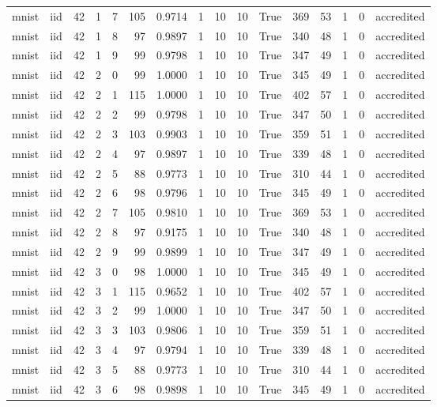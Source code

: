 \begin{tabular}{llrrrrrrrrrrrrrl}
mnist & iid & 42 & 1 & 7 & 105 & 0.9714 & 1 & 10 & 10 & True & 369 & 53 & 1 & 0 & accredited \\
mnist & iid & 42 & 1 & 8 & 97 & 0.9897 & 1 & 10 & 10 & True & 340 & 48 & 1 & 0 & accredited \\
mnist & iid & 42 & 1 & 9 & 99 & 0.9798 & 1 & 10 & 10 & True & 347 & 49 & 1 & 0 & accredited \\
mnist & iid & 42 & 2 & 0 & 99 & 1.0000 & 1 & 10 & 10 & True & 345 & 49 & 1 & 0 & accredited \\
mnist & iid & 42 & 2 & 1 & 115 & 1.0000 & 1 & 10 & 10 & True & 402 & 57 & 1 & 0 & accredited \\
mnist & iid & 42 & 2 & 2 & 99 & 0.9798 & 1 & 10 & 10 & True & 347 & 50 & 1 & 0 & accredited \\
mnist & iid & 42 & 2 & 3 & 103 & 0.9903 & 1 & 10 & 10 & True & 359 & 51 & 1 & 0 & accredited \\
mnist & iid & 42 & 2 & 4 & 97 & 0.9897 & 1 & 10 & 10 & True & 339 & 48 & 1 & 0 & accredited \\
mnist & iid & 42 & 2 & 5 & 88 & 0.9773 & 1 & 10 & 10 & True & 310 & 44 & 1 & 0 & accredited \\
mnist & iid & 42 & 2 & 6 & 98 & 0.9796 & 1 & 10 & 10 & True & 345 & 49 & 1 & 0 & accredited \\
mnist & iid & 42 & 2 & 7 & 105 & 0.9810 & 1 & 10 & 10 & True & 369 & 53 & 1 & 0 & accredited \\
mnist & iid & 42 & 2 & 8 & 97 & 0.9175 & 1 & 10 & 10 & True & 340 & 48 & 1 & 0 & accredited \\
mnist & iid & 42 & 2 & 9 & 99 & 0.9899 & 1 & 10 & 10 & True & 347 & 49 & 1 & 0 & accredited \\
mnist & iid & 42 & 3 & 0 & 98 & 1.0000 & 1 & 10 & 10 & True & 345 & 49 & 1 & 0 & accredited \\
mnist & iid & 42 & 3 & 1 & 115 & 0.9652 & 1 & 10 & 10 & True & 402 & 57 & 1 & 0 & accredited \\
mnist & iid & 42 & 3 & 2 & 99 & 1.0000 & 1 & 10 & 10 & True & 347 & 50 & 1 & 0 & accredited \\
mnist & iid & 42 & 3 & 3 & 103 & 0.9806 & 1 & 10 & 10 & True & 359 & 51 & 1 & 0 & accredited \\
mnist & iid & 42 & 3 & 4 & 97 & 0.9794 & 1 & 10 & 10 & True & 339 & 48 & 1 & 0 & accredited \\
mnist & iid & 42 & 3 & 5 & 88 & 0.9773 & 1 & 10 & 10 & True & 310 & 44 & 1 & 0 & accredited \\
mnist & iid & 42 & 3 & 6 & 98 & 0.9898 & 1 & 10 & 10 & True & 345 & 49 & 1 & 0 & accredited \\

\end{tabular}
